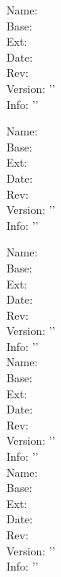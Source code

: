 \documentclass{article}
\begin{document}
\def\info{%
Name: \filename \\
Base: \filebase \\
Ext:  \fileext  \\
Date: \filedate \\
Rev: \filerev \\
Version: '\fileversion' \\
Info: '\fileinfo' \\
}
\info


\info

\let\filename\relax
\let\filedate\relax
\let\fileinfo\relax

\info

\info

\info
\end{document}
